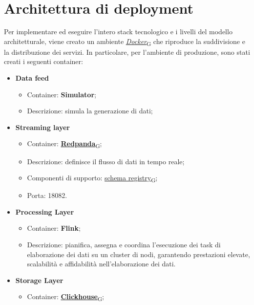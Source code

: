 \section{Architettura di deployment}
Per implementare ed eseguire l'intero stack tecnologico e i livelli del modello architetturale, viene creato un ambiente \href{https://7last.github.io/docs/pb/documentazione-interna/glossario\#docker}{\textit{Docker}\textsubscript{G}} che riproduce la suddivisione e la distribuzione dei servizi. In particolare, per l'ambiente di produzione, sono stati creati i seguenti container:
\begin{itemize}
    \item \textbf{Data feed}
        \begin{itemize}
            \item Container: \textbf{Simulator};
            \item Descrizione: simula la generazione di dati;
        \end{itemize}
    \item \textbf{Streaming layer}
        \begin{itemize}
            \item Container: \href{https://7last.github.io/docs/pb/documentazione-interna/glossario\#redpanda}{\textbf{Redpanda}\textsubscript{G}};
            \item Descrizione: definisce il flusso di dati in tempo reale;
            \item Componenti di supporto: \href{https://7last.github.io/docs/pb/documentazione-interna/glossario\#schema-registry}{schema registry\textsubscript{G}};
            \item Porta: 18082.
        \end{itemize}
    \item \textbf{Processing Layer}
        \begin{itemize}
            \item Container: \textbf{Flink};
            \item Descrizione: pianifica, assegna e coordina l'esecuzione dei task di elaborazione dei dati su un cluster di nodi, garantendo prestazioni elevate, scalabilità e affidabilità nell'elaborazione dei dati.
        \end{itemize}
    \item \textbf{Storage Layer}
        \begin{itemize}
            \item Container: \href{https://7last.github.io/docs/pb/documentazione-interna/glossario\#clickhouse}{\textbf{Clickhouse}\textsubscript{G}};

\end{itemize}
\end{itemize}

